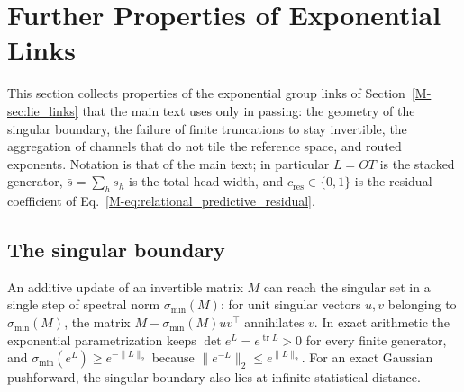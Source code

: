 \documentclass[twoside,11pt]{article}
\begin{document}
\section{Further Properties of Exponential Links}
\label{supp:exp_links}

This section collects properties of the exponential group links of Section~\ref{M-sec:lie_links} that the main text uses only in passing: the geometry of the singular boundary, the failure of finite truncations to stay invertible, the aggregation of channels that do not tile the reference space, and routed exponents. Notation is that of the main text; in particular $L=OT$ is the stacked generator, $\bar s=\sum_hs_h$ is the total head width, and $c_{\mathrm{res}}\in\{0,1\}$ is the residual coefficient of Eq.~\eqref{M-eq:relational_predictive_residual}.

\subsection{The singular boundary}
\label{supp:singular_boundary}

An additive update of an invertible matrix $M$ can reach the singular set in a single step of spectral norm $\sigma_{\min}(M)$: for unit singular vectors $u,v$ belonging to $\sigma_{\min}(M)$, the matrix $M-\sigma_{\min}(M)uv^\top$ annihilates $v$. In exact arithmetic the exponential parametrization keeps $\det e^{L}=e^{\operatorname{tr}L}>0$ for every finite generator, and $\sigma_{\min}(e^{L})\ge e^{-\|L\|_2}$ because $\|e^{-L}\|_2\le e^{\|L\|_2}$. For an exact Gaussian pushforward, the singular boundary also lies at infinite statistical distance.
\end{document}
